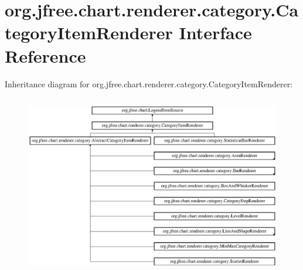 \hypertarget{interfaceorg_1_1jfree_1_1chart_1_1renderer_1_1category_1_1_category_item_renderer}{}\section{org.\+jfree.\+chart.\+renderer.\+category.\+Category\+Item\+Renderer Interface Reference}
\label{interfaceorg_1_1jfree_1_1chart_1_1renderer_1_1category_1_1_category_item_renderer}
Inheritance diagram for org.\+jfree.\+chart.\+renderer.\+category.\+Category\+Item\+Renderer\+:\begin{figure}[H]
\begin{center}
\leavevmode
\includegraphics[height=7.938145cm]{interfaceorg_1_1jfree_1_1chart_1_1renderer_1_1category_1_1_category_item_renderer}
\end{center}
\end{figure}
